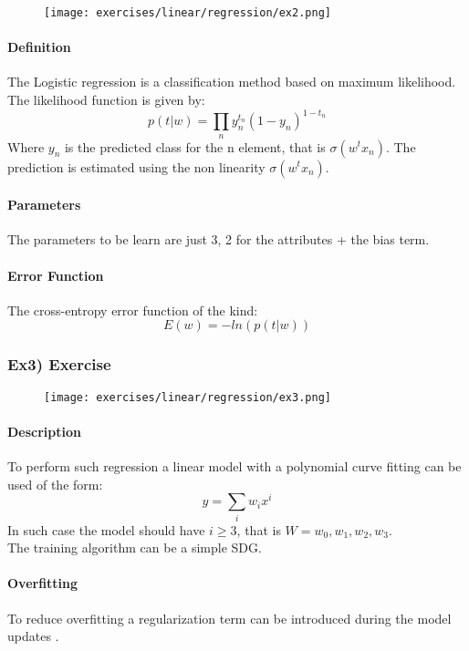 \begin{figure}[H]
    \centering
    \texttt{[image: exercises/linear/regression/ex2.png]}
\end{figure}
 
 \paragraph{Definition}
The Logistic regression is a classification method based on maximum likelihood.
The likelihood function is given by:
$$p(t|w)=\prod_n y_n^{t_n}(1-y_n)^{1-t_n}$$
Where $y_n$ is the predicted class for the n element, that is $\sigma(w^tx_n)$. The prediction is estimated using the non linearity $\sigma(w^tx_n)$.

\paragraph{Parameters}
The parameters to be learn are just 3, 2 for the attributes + the bias term.

\paragraph{Error Function}
The cross-entropy error function of the kind:
$$E(w)=-ln(p(t|w))$$

\subsubsection{Ex3) Exercise }

\begin{figure}[H]
    \centering
    \texttt{[image: exercises/linear/regression/ex3.png]}
\end{figure}

\paragraph{Description}
To perform such regression a linear model with a polynomial curve fitting can be used of the form:
$$y=\sum_i w_ix^i$$
In such case the model should have $i \ge 3$, that is $W=w_0,w_1,w_2,w_3$.\\
The training algorithm can be a simple SDG.

\paragraph{Overfitting}
To reduce overfitting a regularization term can be introduced during the model updates .





